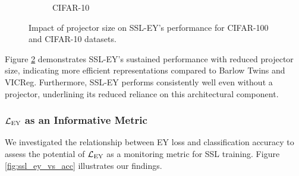 \begin{figure}[H]
\begin{subfigure}[b]{0.48\textwidth}
        \caption{CIFAR-10}
        \label{fig:ssl_projector_dimensions_10}
    \end{subfigure}
    \caption{Impact of projector size on SSL-EY's performance for CIFAR-100 and CIFAR-10 datasets.}
    \label{fig:ssl_projector_dim}
\end{figure}

Figure \ref{fig:ssl_projector_dim} demonstrates SSL-EY's sustained performance with reduced projector size, indicating more efficient representations compared to Barlow Twins and VICReg. Furthermore, SSL-EY performs consistently well even without a projector, underlining its reduced reliance on this architectural component.

\subsubsection{$\mathcal{L}_\text{EY}$ as an Informative Metric}
We investigated the relationship between EY loss and classification accuracy to assess the potential of $\mathcal{L}_\text{EY}$ as a monitoring metric for SSL training. Figure \ref{fig:ssl_ey_vs_acc} illustrates our findings.

